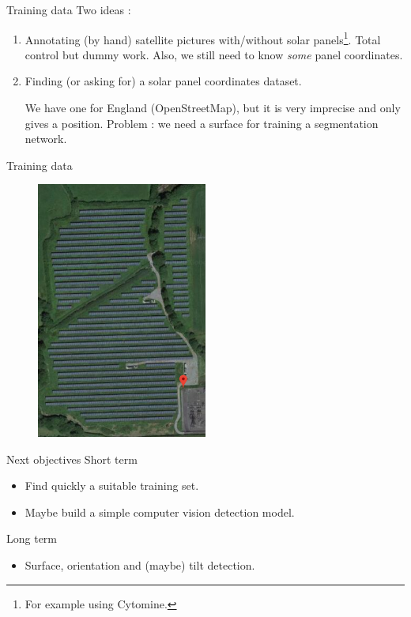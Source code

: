 \documentclass[12pt]{beamer}
\begin{document}
\begin{frame}{Training data}
    Two ideas :
    \begin{enumerate}
        \item Annotating (by hand) satellite pictures with/without solar panels\footnote{For example using \alert{Cytomine}.}. Total control but dummy work. Also, we still need to know \emph{some} panel coordinates.
        \item Finding (or asking for) a solar panel coordinates dataset.
        
        We have one for England (\alert{OpenStreetMap}), but it is very imprecise and only gives a \alert{position}. Problem : we need a \alert{surface} for training a segmentation network.
    \end{enumerate}
\end{frame}

\begin{frame}{Training data}
    \begin{figure}
        \centering
        \includegraphics[width=0.5\textwidth]{resources/png/england.png}
    \end{figure}
\end{frame}

\begin{frame}{Next objectives}
    Short term
    \begin{itemize}
        \item Find quickly a suitable training set.
        \item Maybe build a simple computer vision detection model.
    \end{itemize}
    Long term
    \begin{itemize}
        \item Surface, orientation and (maybe) tilt detection.
    \end{itemize}
\end{frame}
\end{document}
